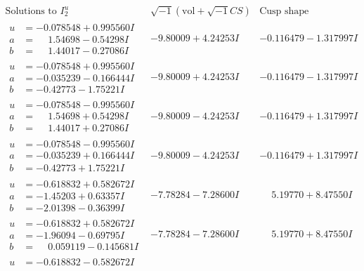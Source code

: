 \documentclass[1p]{elsarticle_modified}
\theoremstyle{definition}
\newcommand{\I}{\sqrt{-1}}
\begin{document}
$$\begin{array}{c|c|c}  
\text{Solutions to }I^u_{2}& \I (\text{vol} + \sqrt{-1}CS) & \text{Cusp shape}\\
 \hline 
\begin{aligned}
u &= -0.078548 + 0.995560 I \\
a &= \phantom{-}1.54698 - 0.54298 I \\
b &= \phantom{-}1.44017 - 0.27086 I\end{aligned}
 & -9.80009 + 4.24253 I & -0.116479 - 1.317997 I \\ \hline\begin{aligned}
u &= -0.078548 + 0.995560 I \\
a &= -0.035239 - 0.166444 I \\
b &= -0.42773 - 1.75221 I\end{aligned}
 & -9.80009 + 4.24253 I & -0.116479 - 1.317997 I \\ \hline\begin{aligned}
u &= -0.078548 - 0.995560 I \\
a &= \phantom{-}1.54698 + 0.54298 I \\
b &= \phantom{-}1.44017 + 0.27086 I\end{aligned}
 & -9.80009 - 4.24253 I & -0.116479 + 1.317997 I \\ \hline\begin{aligned}
u &= -0.078548 - 0.995560 I \\
a &= -0.035239 + 0.166444 I \\
b &= -0.42773 + 1.75221 I\end{aligned}
 & -9.80009 - 4.24253 I & -0.116479 + 1.317997 I \\ \hline\begin{aligned}
u &= -0.618832 + 0.582672 I \\
a &= -1.45203 + 0.63357 I \\
b &= -2.01398 - 0.36399 I\end{aligned}
 & -7.78284 - 7.28600 I & \phantom{-}5.19770 + 8.47550 I \\ \hline\begin{aligned}
u &= -0.618832 + 0.582672 I \\
a &= -1.96094 - 0.69795 I \\
b &= \phantom{-}0.059119 - 0.145681 I\end{aligned}
 & -7.78284 - 7.28600 I & \phantom{-}5.19770 + 8.47550 I \\ \hline\begin{aligned}
u &= -0.618832 - 0.582672 I \\

\end{aligned}
\end{array}$$
\end{document}
